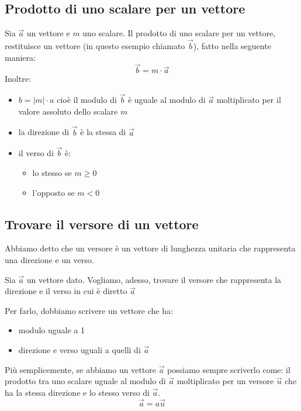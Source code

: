 \subsection{Prodotto di uno scalare per un vettore}
Sia $\overrightarrow{a}$ un vettore e $m$ uno scalare. Il prodotto di uno scalare per un vettore, restituisce un vettore (in questo esempio chiamato $\overrightarrow{b}$), fatto nella seguente maniera: $$ \overrightarrow{b} = m \cdot \overrightarrow{a} $$
Inoltre:
\begin{itemize}
	\item $b = \left | m \right | \cdot a $ cioè il modulo di $\overrightarrow{b}$ è uguale al modulo di $\overrightarrow{a}$ moltiplicato per il valore assoluto dello scalare $m$
	\item la direzione di $\overrightarrow{b} $ è la stessa di $\overrightarrow{a}$
	\item il verso di $\overrightarrow{b}$ è:
	\begin{itemize}
		\item lo stesso se $ m \geqslant 0 $
		\item l'opposto se $ m < 0 $
	\end{itemize}
\end{itemize}

\subsection{Trovare il versore di un vettore}
Abbiamo detto che un versore è un vettore di lunghezza unitaria che rappresenta una direzione e un verso.

Sia $ \overrightarrow{a} $ un vettore dato. Vogliamo, adesso, trovare il versore che rappresenta la direzione e il verso in cui è diretto $ \overrightarrow{a} $ 

Per farlo, dobbiamo scrivere un vettore che ha:

\begin{itemize}
	\item modulo uguale a 1
	\item direzione e verso uguali a quelli di $ \overrightarrow{a} $
\end{itemize}

Più semplicemente, se abbiamo un vettore $ \overrightarrow{a} $ possiamo sempre scriverlo come: il prodotto tra uno scalare uguale al modulo di $ \overrightarrow{a} $ moltiplicato per un versore $ \overrightarrow{u} $ che ha la stessa direzione e lo stesso verso di $\overrightarrow{a} $.
$$ \overrightarrow{a} = a \overrightarrow{u} $$

